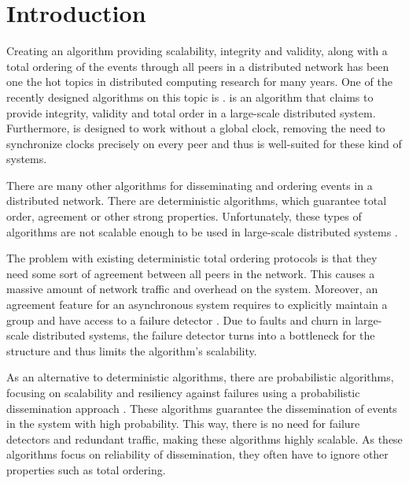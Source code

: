\section{Introduction}

Creating an algorithm providing scalability, integrity and validity, along with a total ordering of the events through all peers in a distributed network has been one the hot topics in distributed computing research for many years. One of the recently designed algorithms on this topic is \epto \autocite{matos2015epto}. \epto is an algorithm that claims to provide integrity, validity and total order in a large-scale distributed system. Furthermore, \epto is designed to work without a global clock, removing the need to synchronize clocks precisely on every peer and thus is well-suited for these kind of systems.
\par 
There are many other algorithms for disseminating and ordering events in a distributed network. There are deterministic algorithms, which guarantee total order, agreement or other strong properties. Unfortunately, these types of algorithms are not scalable enough to be used in large-scale distributed systems \autocites[]{defago2004total}[]{lamport1978time}.
\par
The problem with existing deterministic total ordering protocols is that they need some sort of agreement between all peers in the network. This causes a massive amount of network traffic and overhead on the system.
Moreover, an agreement feature for an asynchronous system requires to
explicitly maintain a group and have access to a failure detector \autocites[]{chandra1996weakest}[]{chandra1996unreliable}. Due to faults and churn in large-scale distributed systems, the failure detector turns into a bottleneck for the structure and thus limits the algorithm's scalability.  
\par
As an alternative to deterministic algorithms, there are probabilistic algorithms, focusing on scalability and resiliency against failures using a probabilistic dissemination approach  \autocite{birman1999bimodal,carvalho2007emergent,demers1987epidemic,eugster2003lightweight,felber2002probabilistic,hayden1996probabilistic,kim2004gossip,Koldehofe02simplegossiping}. These algorithms guarantee the dissemination of events in the system with high probability. This way, there is no need for failure detectors and redundant traffic, making these algorithms highly scalable. As these algorithms focus on reliability of dissemination, they often have to ignore other properties such as total ordering.
